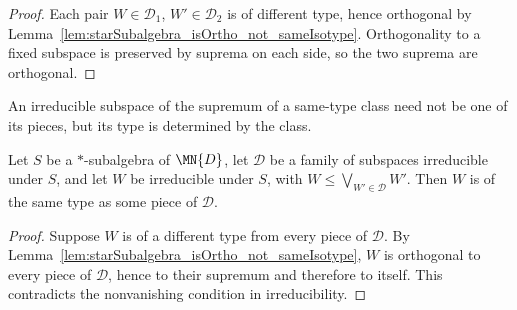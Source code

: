 \begin{proof}
    \leanok
    Each pair $W\in\mathcal D_1$, $W'\in\mathcal D_2$ is of different
    type, hence orthogonal by
    Lemma~\ref{lem:starSubalgebra_isOrtho_not_sameIsotype}. Orthogonality
    to a fixed subspace is preserved by suprema on each side, so the two
    suprema are orthogonal.
\end{proof}

An irreducible subspace of the supremum of a same-type class need not be one
of its pieces, but its type is determined by the class.

\begin{lemma}%
    \label{lem:starSubalgebra_sameIsotype_of_le_sSup}
    \leanok
    Let $S$ be a $*$-subalgebra of $\MN{D}$, let $\mathcal D$ be a family
    of subspaces irreducible under $S$, and let $W$ be irreducible under
    $S$, with $W\leq\bigvee_{W'\in\mathcal D}W'$. Then $W$ is of the same
    type as some piece of $\mathcal D$.
\end{lemma}

\begin{proof}
    \leanok
    Suppose $W$ is of a different type from every piece of $\mathcal D$.
    By Lemma~\ref{lem:starSubalgebra_isOrtho_not_sameIsotype}, $W$ is
    orthogonal to every piece of $\mathcal D$, hence to their supremum and
    therefore to itself. This contradicts the nonvanishing condition in
    irreducibility.
\end{proof}
